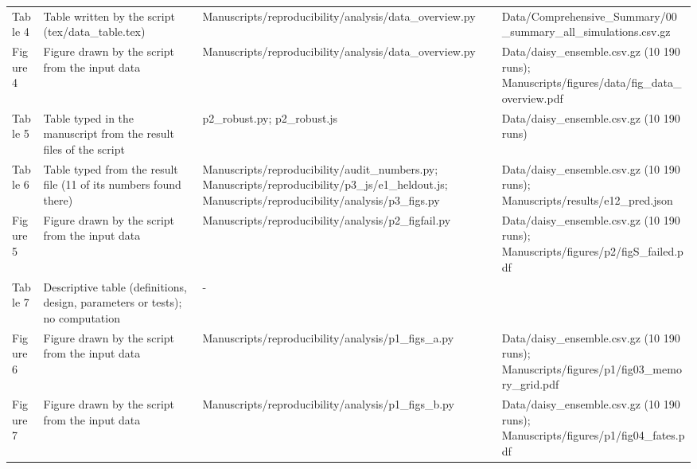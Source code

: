 {\begin{longtable}{p{}p{}p{}p{}}
{}Table 4 & Table written by the script (tex/data\_table.tex) & Manuscripts/\allowbreak{}reproducibility/\allowbreak{}analysis/\allowbreak{}data\_\allowbreak{}overview.py & Data/\allowbreak{}Comprehensive\_\allowbreak{}Summary/\allowbreak{}00\_\allowbreak{}summary\_\allowbreak{}all\_\allowbreak{}simulations.csv.gz\\
{}Figure 4 & Figure drawn by the script from the input data & Manuscripts/\allowbreak{}reproducibility/\allowbreak{}analysis/\allowbreak{}data\_\allowbreak{}overview.py & Data/\allowbreak{}daisy\_\allowbreak{}ensemble.csv.gz (10 190 runs);  Manuscripts/\allowbreak{}figures/\allowbreak{}data/\allowbreak{}fig\_\allowbreak{}data\_\allowbreak{}overview.pdf\\
{}Table 5 & Table typed in the manuscript from the result files of the script & p2\_\allowbreak{}robust.py;  p2\_\allowbreak{}robust.js & Data/\allowbreak{}daisy\_\allowbreak{}ensemble.csv.gz (10 190 runs)\\
{}Table 6 & Table typed from the result file (11 of its numbers found there) & Manuscripts/\allowbreak{}reproducibility/\allowbreak{}audit\_\allowbreak{}numbers.py;  Manuscripts/\allowbreak{}reproducibility/\allowbreak{}p3\_\allowbreak{}js/\allowbreak{}e1\_\allowbreak{}heldout.js;  Manuscripts/\allowbreak{}reproducibility/\allowbreak{}analysis/\allowbreak{}p3\_\allowbreak{}figs.py & Data/\allowbreak{}daisy\_\allowbreak{}ensemble.csv.gz (10 190 runs);  Manuscripts/\allowbreak{}results/\allowbreak{}e12\_\allowbreak{}pred.json\\
{}Figure 5 & Figure drawn by the script from the input data & Manuscripts/\allowbreak{}reproducibility/\allowbreak{}analysis/\allowbreak{}p2\_\allowbreak{}figfail.py & Data/\allowbreak{}daisy\_\allowbreak{}ensemble.csv.gz (10 190 runs);  Manuscripts/\allowbreak{}figures/\allowbreak{}p2/\allowbreak{}figS\_\allowbreak{}failed.pdf\\
{}Table 7 & Descriptive table (definitions, design, parameters or tests); no computation & - & \\
{}Figure 6 & Figure drawn by the script from the input data & Manuscripts/\allowbreak{}reproducibility/\allowbreak{}analysis/\allowbreak{}p1\_\allowbreak{}figs\_\allowbreak{}a.py & Data/\allowbreak{}daisy\_\allowbreak{}ensemble.csv.gz (10 190 runs);  Manuscripts/\allowbreak{}figures/\allowbreak{}p1/\allowbreak{}fig03\_\allowbreak{}memory\_\allowbreak{}grid.pdf\\
{}Figure 7 & Figure drawn by the script from the input data & Manuscripts/\allowbreak{}reproducibility/\allowbreak{}analysis/\allowbreak{}p1\_\allowbreak{}figs\_\allowbreak{}b.py & Data/\allowbreak{}daisy\_\allowbreak{}ensemble.csv.gz (10 190 runs);  Manuscripts/\allowbreak{}figures/\allowbreak{}p1/\allowbreak{}fig04\_\allowbreak{}fates.pdf\\

\end{longtable}}

